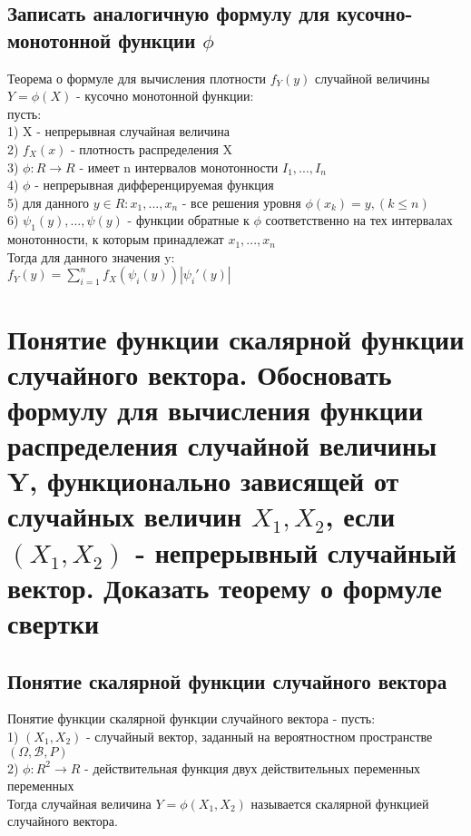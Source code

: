 \subsection{Записать аналогичную формулу для кусочно-монотонной функции $\phi$}
Теорема о формуле для вычисления плотности $f_{Y}(y)$ случайной величины $Y  = \phi(X)$ - кусочно монотонной функции:\\
пусть:\\
1) X - непрерывная случайная величина\\
2) $f_{X}(x)$ - плотность распределения X\\
3) $\phi: R \rightarrow R$ - имеет n интервалов монотонности $I_{1}, ..., I_{n}$\\
4) $\phi$ - непрерывная дифференцируемая функция\\
5) для данного $y \in R: x_{1}, ..., x_{n}$ - все решения уровня $\phi(x_{k}) = y, (k \leqslant n)$\\
6) $\psi_{1}(y), ..., \psi(y)$ - функции обратные к $\phi$ соответственно на тех интервалах монотонности, к которым принадлежат $x_{1}, ..., x_{n}$\\

Тогда для данного значения y:\\
$f_{Y}(y) = \sum\limits_{i = 1}^{n} f_{X}(\psi_{i}(y))|\psi_{i}'(y)|$\\

\section{Понятие функции скалярной функции случайного вектора. Обосновать формулу для вычисления функции распределения случайной величины Y, функционально зависящей от случайных величин $X_{1}, X_{2}$, если $(X_{1}, X_{2})$ - непрерывный случайный вектор. Доказать теорему о формуле свертки}
\subsection{Понятие скалярной функции случайного вектора}
Понятие функции скалярной функции случайного вектора - пусть:\\
1) $(X_{1}, X_{2})$ - случайный вектор, заданный на вероятностном пространстве $(\Omega, \mathcal{B}, P)$\\
2) $\phi : R^{2} \rightarrow R$ - действительная функция двух действительных переменных переменных\\
Тогда случайная величина $Y = \phi(X_{1}, X_{2})$ называется скалярной функцией случайного вектора.\\

